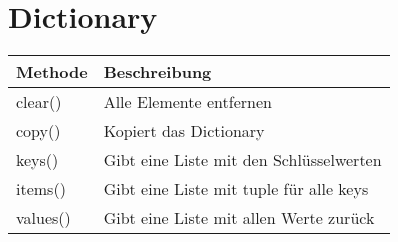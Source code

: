 \section*{Dictionary}
	\begin{minipage}[h]{9cm}
		
	\end{minipage}
	\begin{minipage}[h]{10cm}
		\begin{tabular}{|l l|}
			\hline \bfseries{Methode} & \bfseries{Beschreibung}
			\\\hline clear() & Alle Elemente entfernen
			\\ copy() & Kopiert das Dictionary
			\\ keys() & Gibt eine Liste mit den Schlüsselwerten
			\\ items() & Gibt eine Liste mit tuple für alle keys
			\\ values() & Gibt eine Liste mit allen Werte zurück
			\\\hline
		\end{tabular}
	\end{minipage}